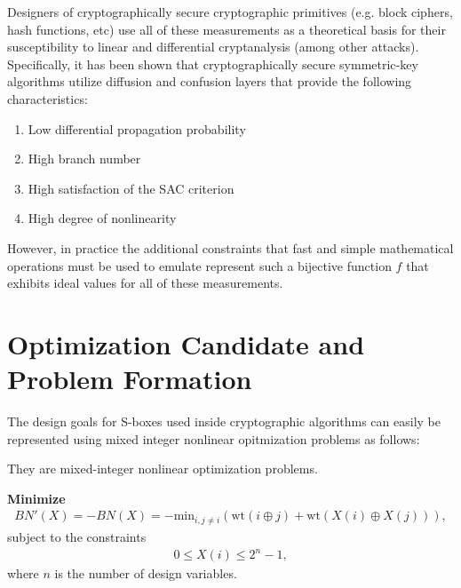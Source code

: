 \documentclass[11pt]{article}
\begin{document}
Designers of cryptographically secure cryptographic primitives (e.g. block ciphers, hash functions, etc) use all of these measurements as a theoretical basis for their susceptibility to linear and differential cryptanalysis (among other attacks). Specifically, it has been shown that cryptographically secure symmetric-key algorithms utilize diffusion and confusion layers that provide the following characteristics:
\begin{enumerate}
	\item Low differential propagation probability
	\item High branch number
	\item High satisfaction of the SAC criterion
	\item High degree of nonlinearity
\end{enumerate}
However, in practice the additional constraints that fast and simple mathematical operations must be used to emulate represent such a bijective function $f$ that exhibits ideal values for all of these measurements.

\section{Optimization Candidate and Problem Formation}

The design goals for S-boxes used inside cryptographic algorithms can easily be represented using mixed integer nonlinear opitmization problems as follows:

They are mixed-integer nonlinear optimization problems.

\textbf{Minimize}
\begin{eqnarray*}
BN'(X) = -BN(X) = -\text{min}_{i, j\not=i}(\text{wt}(i \oplus j) + \text{wt}(X(i) \oplus X(j))),
\end{eqnarray*}
subject to the constraints
\begin{eqnarray*}
0 \leq X(i) \leq 2^{n} - 1,
\end{eqnarray*}
where $n$ is the number of design variables.
\end{document}

